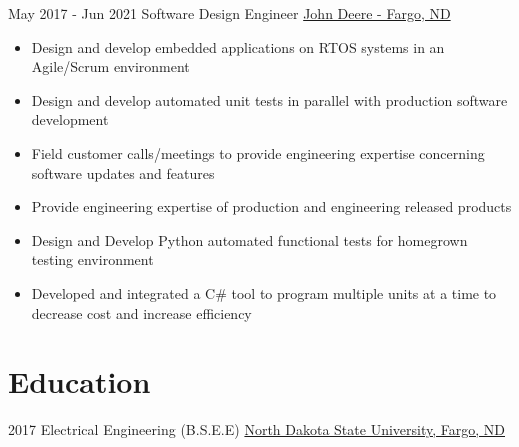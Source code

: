 \documentclass[letterpaper]{tenseconds} %
\begin{document}
\begin{twenty}
	\twentyitem
	{May 2017 -}
	{Jun 2021}
	{Software Design Engineer}
	{\href{https://www.deere.com/en/index.html}{John Deere - Fargo, ND}}
	{}
	{\begin{itemize}
		\item Design and develop embedded applications on RTOS systems in an Agile/Scrum environment
		\item Design and develop automated unit tests in parallel with production software development
		\item Field customer calls/meetings to provide engineering expertise concerning software updates and features
    \item Provide engineering expertise of production and engineering released products
    \item Design and Develop Python automated functional tests for homegrown testing environment
    \item Developed and integrated a C\# tool to program multiple units at a time to decrease cost and increase efficiency
		\end{itemize}}
\end{twenty}

\section{Education}
\begin{twenty} %
	\twentyitem
	{2017}
	{}
	{Electrical Engineering \textnormal{(B.S.E.E)}}
	{\href{https://www.ndsu.edu/}{North Dakota State University, Fargo, ND}}
	{}
	{}
\end{twenty}
\end{document}
